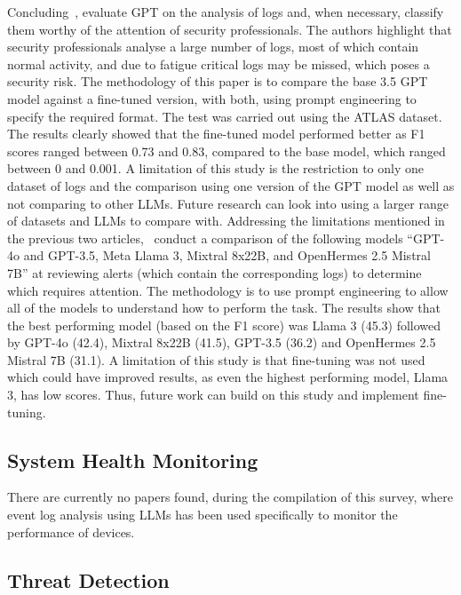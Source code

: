 Concluding~\cite{hermann2024gpt}, evaluate GPT on the analysis of logs and, when necessary, classify them worthy of the attention of security professionals. The authors highlight that security professionals analyse a large number of logs, most of which contain normal activity, and due to fatigue critical logs may be missed, which poses a security risk. The methodology of this paper is to compare the base 3.5 GPT model against a fine-tuned version, with both, using prompt engineering to specify the required format. The test was carried out using the ATLAS dataset. The results clearly showed that the fine-tuned model performed better as F1 scores ranged between 0.73 and 0.83, compared to the base model, which ranged between 0 and 0.001. A limitation of this study is the restriction to only one dataset of logs and the comparison using one version of the GPT model as well as not comparing to other LLMs. Future research can look into using a larger range of datasets and LLMs to compare with. Addressing the limitations mentioned in the previous two articles,~\cite{oniagbi2024evaluation} conduct a comparison of the following models ``GPT-4o and GPT-3.5, Meta Llama 3, Mixtral 8x22B, and OpenHermes 2.5 Mistral 7B'' at reviewing alerts (which contain the corresponding logs) to determine which requires attention. The methodology is to use prompt engineering to allow all of the models to understand how to perform the task. The results show that the best performing model (based on the F1 score) was Llama 3 (45.3) followed by GPT-4o (42.4), Mixtral 8x22B (41.5), GPT-3.5 (36.2) and OpenHermes 2.5 Mistral 7B (31.1). A limitation of this study is that fine-tuning was not used which could have improved results, as even the highest performing model, Llama 3, has low scores. Thus, future work can build on this study and implement fine-tuning.

\subsection{System Health Monitoring}
There are currently no papers found, during the compilation of this survey, where event log analysis using LLMs has been used specifically to monitor the performance of devices.

\subsection{Threat Detection}
